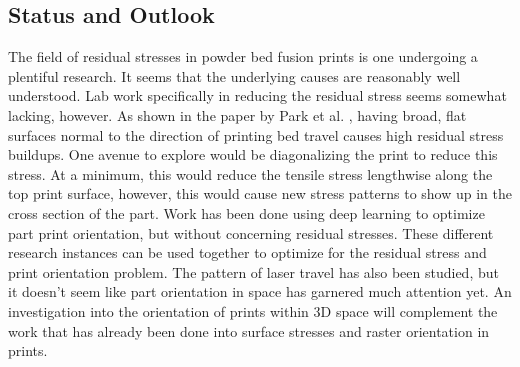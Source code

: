 \subsection{Status and Outlook}
The field of residual stresses in powder bed fusion prints is one undergoing a plentiful research.  It seems that the underlying causes are reasonably well understood.  Lab work specifically in reducing the residual stress seems somewhat lacking, however.  As shown in the paper by Park et al. \cite{park2024microstructure}, having broad, flat surfaces normal to the direction of printing bed travel causes high residual stress buildups.  One avenue to explore would be diagonalizing the print to reduce this stress.  At a minimum, this would reduce the tensile stress lengthwise along the top print surface, however, this would cause new stress patterns to show up in the cross section of the part.  
\newline \indent Work has been done using deep learning to optimize part print orientation, but without concerning residual stresses.  These different research instances can be used together to optimize for the residual stress and print orientation problem.  The pattern of laser travel has also been studied, but it doesn’t seem like part orientation in space has garnered much attention yet.  An investigation into the orientation of prints within 3D space will complement the work that has already been done into surface stresses and raster orientation in prints.
